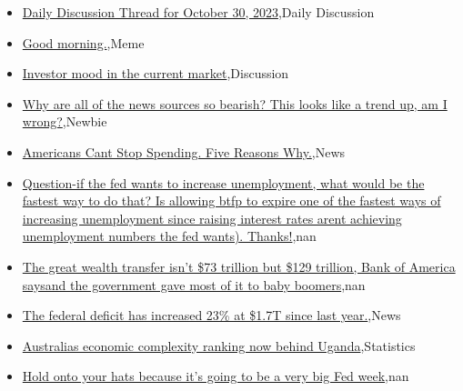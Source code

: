 \documentclass{article}%
\begin{document}
%
\begin{itemize}%
\item%
\href{https://reddit.com/r/wallstreetbets/comments/17jpwjr/daily\_discussion\_thread\_for\_october\_30\_2023/}{Daily Discussion Thread for October 30, 2023},Daily Discussion%
\item%
\href{https://reddit.com/r/wallstreetbets/comments/17jna5a/good\_morning/}{Good morning.},Meme%
\item%
\href{https://reddit.com/r/StockMarket/comments/17j6wxz/investor\_mood\_in\_the\_current\_market/}{Investor mood in the current market},Discussion%
\item%
\href{https://reddit.com/r/StockMarket/comments/17j4deu/why\_are\_all\_of\_the\_news\_sources\_so\_bearish\_this/}{Why are all of the news sources so bearish? This looks like a trend up, am I wrong?},Newbie%
\item%
\href{https://reddit.com/r/Economics/comments/17jm6yh/americans\_cant\_stop\_spending\_five\_reasons\_why/}{Americans Cant Stop Spending. Five Reasons Why.},News%
\item%
\href{https://reddit.com/r/Economics/comments/17jh3pk/questionif\_the\_fed\_wants\_to\_increase\_unemployment/}{Question-if the fed wants to increase unemployment, what would be the fastest way to do that? Is allowing btfp to expire one of the fastest ways of increasing unemployment since raising interest rates arent achieving unemployment numbers the fed wants). Thanks!},nan%
\item%
\href{https://reddit.com/r/Economics/comments/17jcyv4/the\_great\_wealth\_transfer\_isnt\_73\_trillion\_but/}{The great wealth transfer isn't \$73 trillion but \$129 trillion, Bank of America saysand the government gave most of it to baby boomers},nan%
\item%
\href{https://reddit.com/r/Economics/comments/17jcqmj/the\_federal\_deficit\_has\_increased\_23\_at\_17t\_since/}{The federal deficit has increased 23\% at \$1.7T since last year.},News%
\item%
\href{https://reddit.com/r/Economics/comments/17jbdpd/australias\_economic\_complexity\_ranking\_now\_behind/}{Australias economic complexity ranking now behind Uganda},Statistics%
\item%
\href{https://reddit.com/r/Economics/comments/17jb7s8/hold\_onto\_your\_hats\_because\_its\_going\_to\_be\_a/}{Hold onto your hats because it's going to be a very big Fed week},nan%
\end{itemize}%
\end{document}
